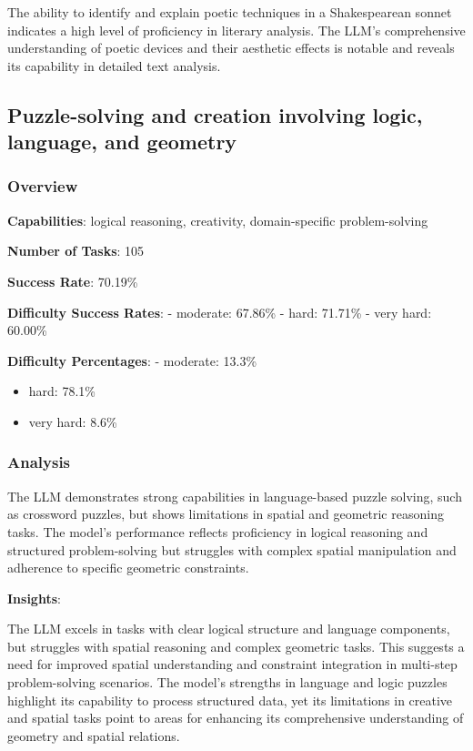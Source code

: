 \documentclass[fleqn,10pt]{wlscirep}
\begin{document}
The ability to identify and explain poetic techniques in a Shakespearean
sonnet indicates a high level of proficiency in literary analysis. The
LLM's comprehensive understanding of poetic devices and their aesthetic
effects is notable and reveals its capability in detailed text analysis.

\hypertarget{puzzle-solving-and-creation-involving-logic-language-and-geometry}{%
\subsection{Puzzle-solving and creation involving logic, language, and
geometry}\label{puzzle-solving-and-creation-involving-logic-language-and-geometry}}

\hypertarget{overview-11}{%
\subsubsection{Overview}\label{overview-11}}

\textbf{Capabilities}: logical reasoning, creativity, domain-specific
problem-solving

\textbf{Number of Tasks}: 105

\textbf{Success Rate}: 70.19\%

\textbf{Difficulty Success Rates}: - moderate: 67.86\% - hard: 71.71\% -
very hard: 60.00\%

\textbf{Difficulty Percentages}: - moderate: 13.3\%

\begin{itemize}
\item
  hard: 78.1\%
\item
  very hard: 8.6\%
\end{itemize}

\hypertarget{analysis-10}{%
\subsubsection{Analysis}\label{analysis-10}}

The LLM demonstrates strong capabilities in language-based puzzle
solving, such as crossword puzzles, but shows limitations in spatial and
geometric reasoning tasks. The model's performance reflects proficiency
in logical reasoning and structured problem-solving but struggles with
complex spatial manipulation and adherence to specific geometric
constraints.

\textbf{Insights}:

The LLM excels in tasks with clear logical structure and language
components, but struggles with spatial reasoning and complex geometric
tasks. This suggests a need for improved spatial understanding and
constraint integration in multi-step problem-solving scenarios. The
model's strengths in language and logic puzzles highlight its capability
to process structured data, yet its limitations in creative and spatial
tasks point to areas for enhancing its comprehensive understanding of
geometry and spatial relations.
\end{document}
